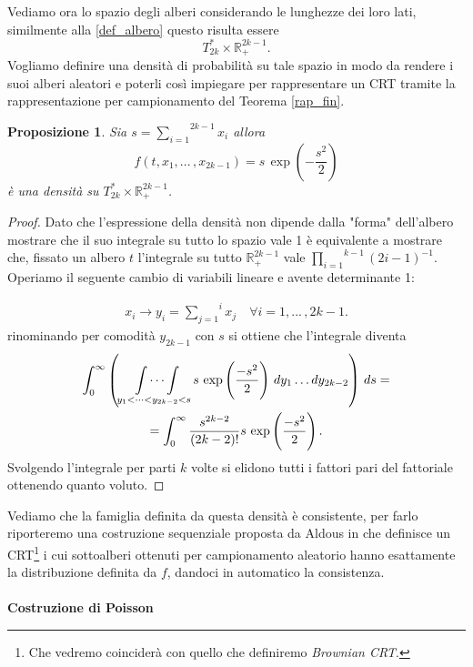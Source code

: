 \documentclass[11pt, twoside]{report}
\theoremstyle{definition}
\theoremstyle{plain}
\newtheorem{prop}[teo]{Proposizione}
\theoremstyle{remark}
\numberwithin{equation}{chapter}
\begin{document}
Vediamo ora lo spazio degli alberi considerando le lunghezze dei loro lati, similmente alla \ref{def_albero} questo risulta essere
$$T_{2k}^* \times \mathbb{R}_+^{2k-1}.$$
Vogliamo definire una densità di probabilità su tale spazio in modo da rendere i suoi alberi aleatori e poterli così impiegare per rappresentare un CRT tramite la rappresentazione per campionamento del Teorema \ref{rap_fin}.
\begin{prop}\label{prop_dens}
Sia $s= \stackrel{2k-1}{\sum\limits_{i=1}}x_i$ allora 
\begin{equation}\label{densi_eq}
f(t, x_1, ...\, ,x_{2k-1})=s \, \exp\left(-\frac{s^2}{2}\right)
\end{equation}
è una densità su ${T_{2k}^* \times \mathbb{R}_+^{2k-1}}$.
\end{prop}
\begin{proof}
Dato che l'espressione della densità non dipende dalla "forma" dell'albero mostrare che il suo integrale su tutto lo spazio vale 1 è equivalente a mostrare che, fissato un albero $t$ l'integrale su tutto $\mathbb{R}_+^{2k-1}$ vale $\stackrel{k-1}{\prod\limits_{i=1}} (2i-1)^{-1}$. Operiamo il seguente cambio di variabili lineare e avente determinante 1:

\begin{gather}
x_i \longrightarrow y_i =\stackrel{i}{\sum\limits_{j=1}}x_j \quad \forall i=1,...\, ,2k-1. \nonumber 
\end{gather}
rinominando per comodità $y_{2k-1}$ con $s$ si ottiene che l'integrale diventa
\begin{gather}
\int_0^\infty \left(\ \idotsint\limits_{y_1< \dots <y_{2k-2}<s} s \, \exp\left(\frac{-s^2}{2}\right) \,dy_1 \dots dy_{2k-2}\right)\,ds= \nonumber \\
= \int_0^\infty \frac{s^{2k-2}}{(2k-2)!} s \, \exp\left(\frac{-s^2}{2}\right).\nonumber
\end{gather}
Svolgendo l'integrale per parti $k$ volte si elidono tutti i fattori pari del fattoriale ottenendo quanto voluto.
\end{proof}
Vediamo che la famiglia definita da questa densità è consistente, per farlo riporteremo una costruzione sequenziale proposta da Aldous in \cite{Ald1} che definisce un CRT\footnote{Che vedremo coinciderà con quello che definiremo \textit{Brownian CRT}.} i cui sottoalberi ottenuti per campionamento aleatorio hanno esattamente la distribuzione definita da $f$, dandoci in automatico la consistenza.\\
\\
\textbf{Costruzione di Poisson}\\
\end{document}
